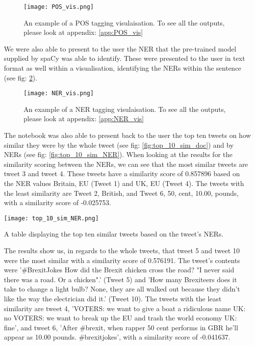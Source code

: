 	\begin{figure}[h]
		\centering
		\texttt{[image: POS\_vis.png]}
		\caption{An example of a POS tagging visulaisation. To see all the outputs, please look at appendix: \ref{app:POS_vis}}
		\label{fig:POS_example}
		
	\end{figure}

	We were also able to present to the user the NER that the pre-trained model supplied by spaCy was able to identify. These were presented to the user in text format as well within a visualisation, identifying the NERs within the sentence (see fig: \ref{fig:NER_example}).
	
	\begin{figure}[h]
		\centering
		\texttt{[image: NER\_vis.png]}
		\caption{An example of a NER tagging visulaisation. To see all the outputs, please look at appendix: \ref{app:NER_vis}}
		\label{fig:NER_example}
		
	\end{figure}

	The notebook was also able to present back to the user the top ten tweets on how similar they were by the whole tweet (see fig: \ref{fig:top_10_sim_doc}) and by NERs (see fig: \ref{fig:top_10_sim_NER}). When looking at the results for the similarity scoring between the NERs, we can see that the most similar tweets are tweet 3 and tweet 4. These tweets have a similarity score of 0.857896 based on the NER values Britain, EU (Tweet 1) and UK, EU (Tweet 4). The tweets with the least similarity are Tweet 2, British, and Tweet 6, 50, cent, 10.00, pounds, with a similarity score of -0.025753.
	 
	
	\begin{table}[h]
		\centering
		\texttt{[image: top\_10\_sim\_NER.png]}
		\caption{A table displaying the top ten similar tweets based on the tweet's NERs.}
		\label{fig:top_10_sim_NER}
		
	\end{table}

	The results show us, in regards to the whole tweets, that tweet 5 and tweet 10 were the most similar with a similarity score of 0.576191. The tweet's contents were '\#BrexitJokes How did the Brexit chicken cross the road? "I never said there was a road. Or a chicken".' (Tweet 5) and 'How many Brexiteers does it take to change a light bulb? None, they are all walked out because they didn't like the way the electrician did it.' (Tweet 10). The tweets with the least similarity are tweet 4, 'VOTERS: we want to give a boat a ridiculous name UK: no VOTERS: we want to break up the EU and trash the world economy UK: fine', and tweet 6, 'After \#brexit, when rapper 50 cent performs in GBR he'll appear as 10.00 pounds. \#brexitjokes', with a similarity score of -0.041637.

